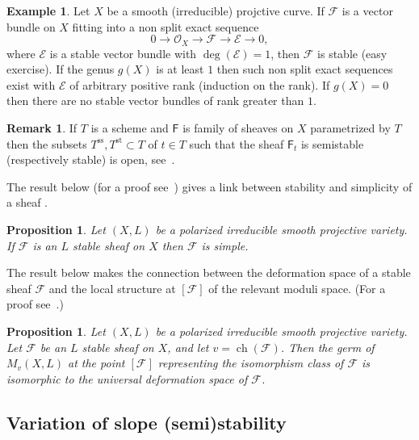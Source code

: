 \documentclass[11pt]{amsart}
\let\mathcal\mathscr
\def\cE{\mathcal{E}}
\def\cF{\mathcal{F}}
\def\cO{\mathcal{O}}
\def\sF{{\mathsf F}}
\DeclareMathOperator{\ch}{ch}
\DeclareMathOperator{\sss}{ss}
\DeclareMathOperator{\st}{st}
\def\lra{\longrightarrow}
\newtheorem{prp}[lmm]{Proposition}
\theoremstyle{definition}
\newtheorem{rmk}[lmm]{Remark}
\newtheorem{expl}[lmm]{Example}
\theoremstyle{remark}
\begin{document}
%
%
\begin{expl}
%
Let $X$ be a smooth (irreducible) projctive curve. If $\cF$ is a vector bundle on $X$ fitting into a non split exact sequence
%
\begin{equation}
%
0\lra \cO_X\lra \cF\lra\cE\lra 0,
%
\end{equation}
%
where $\cE$ is a stable vector bundle with $\deg(\cE)=1$, then $\cF$ is stable (easy exercise). If the genus $g(X)$ is at least $1$ then such non split exact sequences exist with $\cE$ of arbitrary positive rank (induction on the rank). 
If  $g(X)=0$  then there are no stable vector bundles of rank greater than $1$.
%
\end{expl}
%
%
\begin{rmk}\label{rmk:stabaperto}
%
If  $T$ is a  scheme  and  $\sF$ is family of  sheaves on $X$  parametrized by $T$ then the subsets  $T^{\sss},T^{\st}\subset T$ of 
  $t\in T$ such that the sheaf $\sF_t$ is semistable (respectively stable) is open,  
 see~\cite[Prop.~2.3.1]{huy-lehn:librofasci}. 
\end{rmk}
%
The result below (for a proof see~\cite[Cor.1.2.8]{huy-lehn:librofasci}) gives a link between stability and simplicity of a sheaf .
%
\begin{prp}\label{prp:stabsemp}
%
Let $(X,L)$ be  a polarized irreducible smooth projective variety. If $\cF$ is an $L$ stable sheaf on $X$ then $\cF$ is simple.
%
\end{prp}
%
 The  result below makes the connection between the deformation space of a stable sheaf 
 $\cF$ and the local structure at $[\cF]$ of the relevant moduli space.    (For a proof 
 see~\cite[Thm.4.5.1]{huy-lehn:librofasci}.)
%
\begin{prp}\label{prp:modedef}
%
Let $(X,L)$ be  a polarized irreducible smooth projective variety. Let $\cF$ be an $L$ stable sheaf on $X$, and let $v=\ch(\cF)$. Then the germ of $M_v(X,L)$ at the point $[\cF]$ representing the isomorphism class of $\cF$  is isomorphic to the universal deformation space of $\cF$.
%
\end{prp}
%


%
\subsection{Variation of slope (semi)stability}\label{subsec:varstab}
%
%
\setcounter{equation}{0}
%
%
\end{document}
